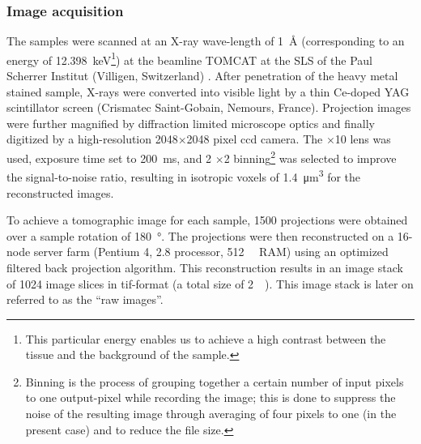 \subsubsection{Image acquisition}
The samples were scanned at an X-ray wave-length of \SI{1}{\angstrom} (corresponding to an energy of \SI{12.398}{\kilo\electronvolt}\footnote{This particular energy enables us to achieve a high contrast between the tissue and the background of the sample.}) at the beamline \ac{TOMCAT} at the \acf{SLS} of the Paul Scherrer Institut (Villigen, Switzerland) \cite{Stampanoni2002,Stampanoni2007}. After penetration of the heavy metal stained sample, X-rays were converted into visible light by a thin Ce-doped \acs{YAG} scintillator screen (Crismatec Saint-Gobain, Nemours, France). Projection images were further magnified by diffraction limited microscope optics and finally digitized by a high-resolution 2048$\times$2048 pixel \ac{ccd} camera. The $\times$10 lens was used, exposure time set to \SI{200}{\milli\second}, and 2 $\times$2 binning\footnote{Binning is the process of grouping together a certain number of input pixels to one output-pixel while recording the image; this is done to suppress the noise of the resulting image through averaging of four pixels to one (in the present case) and to reduce the file size.} was selected to improve the signal-to-noise ratio, resulting in isotropic voxels of \SI{1.4}{\micro\meter\cubed} for the reconstructed images.

To achieve a tomographic image for each sample, 1500 projections were obtained over a sample rotation of \SI{180}{\degree}. The projections were then reconstructed on a 16-node server farm (Pentium 4, \SI{2.8}{\gigahertz} processor, \SI{512}{\mega\byte} \acs{RAM}) using an optimized filtered back projection algorithm. This reconstruction results in an image stack of 1024 image slices in tif-format (a total size of \SI{2}{\giga\byte}). This image stack is later on referred to as the ``raw images''.

